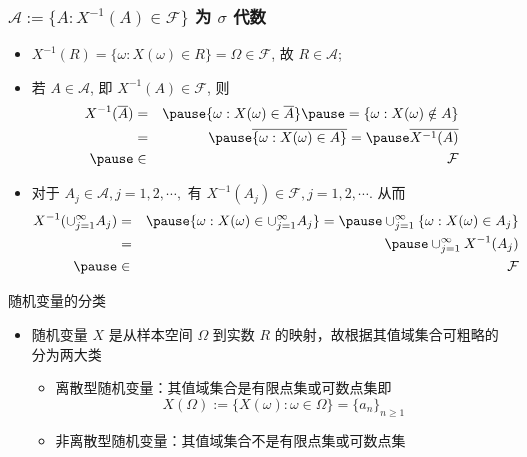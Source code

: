 \begin{frame}
	\frametitle{$\mathcal{A}:=\{A:X^{-1}(A)\in \mathcal{F}\}$ 为 $\sigma$ 代数}
	\begin{itemize}[<+-|alert@+>]
		\item $X^{-1}(R)=\{\omega:X (\omega)\in R\}=\Omega\in \mathcal{F}$, 故 $R\in\mathcal{A}$;
		\item 若 $A\in\mathcal{A}$, 即 $X^{-1}(A)\in \mathcal{F}$, 则
		      \begin{eqnarray*}
			      X^{-1}(\overline{A})&=&\pause \{\omega: X(\omega)\in \overline{A}\}\pause =\{\omega:X(\omega)\notin A\}\\
			      &=&\pause \overline{\{\omega:X(\omega)\in A\}}=\pause \overline{X^{-1}(A)}\\ \pause &\in&  \mathcal{F}
		      \end{eqnarray*}
		\item 对于 $A_j\in \mathcal{A}, j=1,2,\cdots,$ 有 $X^{-1}(A_j)\in \mathcal{F},j=1,2,\cdots.$ 从而
		      \begin{eqnarray*}
			      X^{-1}(\cup_{j=1}^\infty A_j)&=&\pause \{\omega:X(\omega)\in\cup_{j=1}^\infty A_j\}
			      =\pause \cup_{j=1}^\infty \{\omega:X(\omega)\in A_j\}\\
			      &=&\pause \cup_{j=1}^\infty X^{-1}(A_j)\\ \pause &\in&\mathcal{F}
		      \end{eqnarray*}

	\end{itemize}
\end{frame}

\begin{frame}{随机变量的分类}
	\begin{itemize}[<+-|alert@+>]
		\item 随机变量 $X$ 是从样本空间 $\Omega$ 到实数 $R$ 的映射，故根据其值域集合可粗略的分为两大类
		      \begin{itemize}[<+-|alert@+>]
			      \item 离散型随机变量：其值域集合是有限点集或可数点集即
			            \[X(\Omega):=\{X(\omega):\omega\in \Omega\}=\{a_n\}_{n\geq 1}\]
			      \item 非离散型随机变量：其值域集合不是有限点集或可数点集
		      \end{itemize}
	\end{itemize}
\end{frame}



